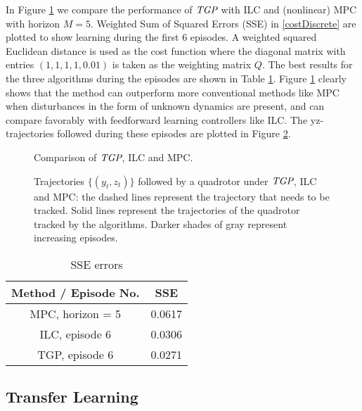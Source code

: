In Figure \ref{fig:comparison} we compare the performance of $\emph{TGP}$ with ILC and (nonlinear) MPC with horizon $M = 5$. Weighted Sum of Squared Errors (SSE) in \eqref{costDiscrete} are plotted to show learning during the first 6 episodes. A weighted squared Euclidean distance is used as the cost function where the diagonal matrix with entries $(1,1,1,1,0.01)$ is taken as the weighting matrix $Q$. The best results for the three algorithms during the episodes are shown in Table \ref{SSE_errors}. Figure \ref{fig:comparison} clearly shows that the method can outperform more conventional methods like MPC when disturbances in the form of unknown dynamics are present, and can compare favorably with feedforward learning controllers like ILC. The yz-trajectories followed during these episodes are plotted in Figure \ref{fig:trajectories}.

\begin{figure}
\center
\scalebox{.5}{}
\caption{Comparison of $\emph{TGP}$, ILC and MPC.}
\label{fig:comparison}
\end{figure}


\begin{figure}
\center	

\caption{Trajectories $\{(y_t,z_t)\}$ followed by a quadrotor under $\emph{TGP}$, ILC and MPC: the dashed lines represent the trajectory that needs to be tracked. Solid lines represent the trajectories of the quadrotor tracked by the algorithms. Darker shades of gray represent increasing episodes.}
\label{fig:trajectories}
\end{figure}

\begin{table}[h!t]
\renewcommand{\arraystretch}{1.3}
\caption{SSE errors}
\label{SSE_errors}
\centering
\begin{tabular}{cc}
\textbf{Method / Episode No.} & SSE \\
\hline
MPC, horizon = 5 & 0.0617 \\
ILC, episode 6 & 0.0306 \\
TGP, episode 6 & 0.0271 \\
\end{tabular}
\end{table}

\subsection{Transfer Learning}

